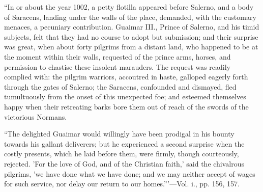 ``In
or about the year 1002, a petty flotilla appeared before Salerno, and
a body of Saracens, landing under the walls of the place, demanded,
with the customary menaces, a pecuniary contribution. Guaimar III.,
Prince of Salerno, and his timid subjects, felt that they had no
course to adopt but submission; and their surprise was great, when
about forty pilgrims from a distant land, who happened to be at the
moment within their walls, requested of the prince arms, horses, and
permission to chastise these insolent marauders. The request was
readily complied with: the pilgrim warriors, accoutred in haste,
galloped eagerly forth through the gates of Salerno; the Saracens,
confounded and dismayed, fled tumultuously from the onset of this
unexpected foe; and esteemed themselves happy when their retreating
barks bore them out of reach of the swords of the victorious Normans.

``The
delighted Guaimar would willingly have been prodigal in his bounty
towards his gallant deliverers; but he experienced a second surprise
when the costly presents, which he laid before them, were firmly,
though courteously, rejected. 'For the love of God, and of the
Christian faith,' said the chivalrous pilgrims, 'we have done what we
have done; and we may neither accept of wages for such service, nor
delay our return to our homes.'''—Vol. i., pp. 156, 157.

